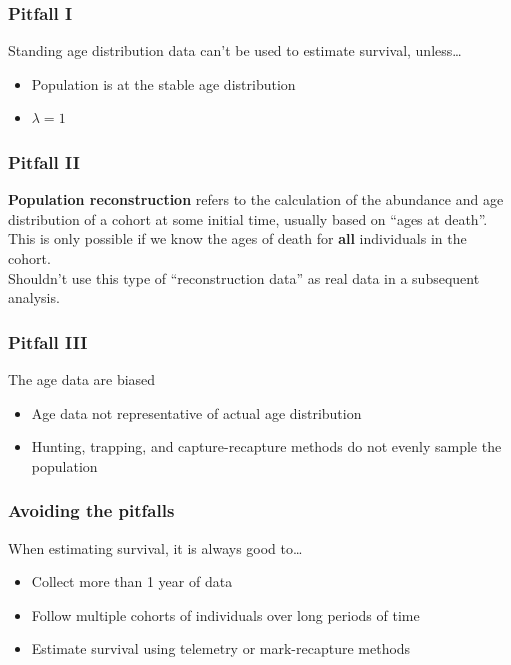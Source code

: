 \documentclass[color=usenames,dvipsnames]{beamer}\usepackage[]{graphicx}\usepackage[]{color}
\begin{document}
\begin{frame}
  \frametitle{Pitfall I}
  \large
  Standing age distribution data can't be used to estimate
    survival, unless\dots \\
  \begin{itemize}
    \item Population is at the stable age distribution
    \item $\lambda = 1$
  \end{itemize}
\end{frame}



\begin{frame}
  \frametitle{Pitfall II}
  \large
  {\bf Population reconstruction} refers to the calculation of the abundance
  and age distribution of a cohort at some initial time, usually based
  on ``ages at death''. \\
  \pause
  \vspace{0.5cm}
  This is only possible if we know the ages of death for \alert{\bf all}
  individuals in the cohort. \\
  \pause
  \vspace{0.5cm}
  Shouldn't use this type of ``reconstruction data'' as real data in a
  subsequent analysis.
\end{frame}




\begin{frame}
  \frametitle{Pitfall III}
  {\large %
    The age data are biased \\}
  \large
  \begin{itemize}
    \normalsize
    \item Age data not representative of actual age distribution
    \item Hunting, trapping, and capture-recapture methods do not
      evenly sample the population
  \end{itemize}
\end{frame}





\begin{frame}
  \frametitle{Avoiding the pitfalls}
  \large
    When estimating survival, it is always good to\dots \\
  \begin{itemize}
    \normalsize
    \item Collect more than 1 year of data
    \item Follow multiple cohorts of individuals over long periods of time
    \item Estimate survival using telemetry or mark-recapture methods
  \end{itemize}
\end{frame}
\end{document}
